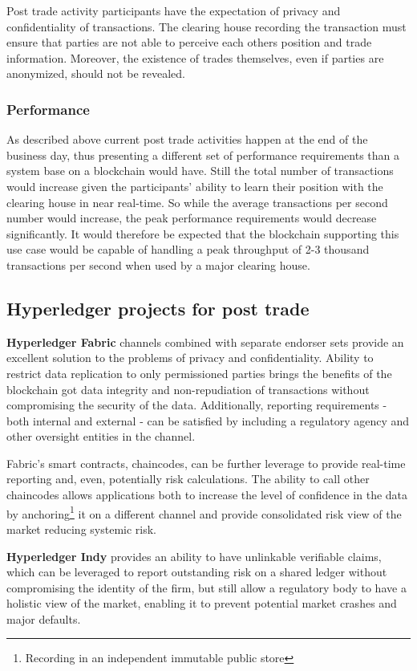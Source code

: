 Post trade activity participants have the expectation of privacy and confidentiality of transactions. The clearing house recording the transaction must ensure that parties are not able to perceive each others position and trade information. Moreover, the existence of trades themselves, even if parties are anonymized, should not be revealed.

\subsubsection{Performance}

As described above current post trade activities happen at the end of the business day, thus presenting a different set of performance requirements than a system base on a blockchain would have. Still the total number of transactions would increase given the participants' ability to learn their position with the clearing house in near real-time. So while the average transactions per second number would increase, the peak performance requirements would decrease significantly. It would therefore be expected that the blockchain supporting this use case would be capable of handling a peak throughput of 2-3 thousand transactions per second when used by a  major clearing house.

\subsection{Hyperledger projects for post trade}
\textbf{Hyperledger Fabric} channels combined with separate endorser sets provide an excellent solution to the problems of privacy and confidentiality. Ability to restrict data replication to only permissioned parties brings the benefits of the blockchain got data integrity and non-repudiation of transactions without compromising the security of the data. Additionally, reporting requirements - both internal and external - can be satisfied by including a regulatory agency and other oversight entities in the channel.

Fabric's smart contracts, chaincodes, can be further leverage to provide real-time reporting and, even, potentially risk calculations. The ability to call other chaincodes allows applications both to increase the level of confidence in the data by anchoring\footnote{Recording in an independent immutable public store} it on a different channel and provide consolidated risk view of the market reducing systemic risk.

\textbf{Hyperledger Indy} provides an ability to have unlinkable verifiable claims, which can be leveraged to report outstanding risk on a shared ledger without compromising the identity of the firm, but still allow a regulatory body to have a holistic view of the market, enabling it to prevent potential market crashes and major defaults.
